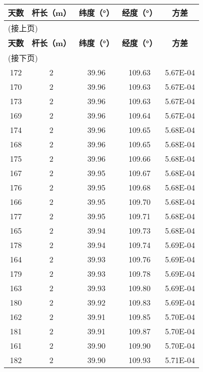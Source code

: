 \begin{longtable}{ccccc}
	
	\hline
	\hline
	\textbf{天数} & \textbf{杆长（m）} & \textbf{纬度（°）} & \textbf{经度（°）} & \textbf{方差}  \\
	\hline
	\hline
	\endfirsthead
	
	\multicolumn{5}{l}{(接上页)}\\
	
	\hline
	\hline
	\textbf{天数} & \textbf{杆长（m）} & \textbf{纬度（°）} & \textbf{经度（°）} & \textbf{方差}  \\
	\hline
	\hline
	\endhead
	\hline
	\multicolumn{5}{l}{(接下页)}
	
	\endfoot
	\hline
	\hline
	\endlastfoot
	171   & 2     & 39.97  & 109.63  & 5.67E-04 \\
	172   & 2     & 39.96  & 109.63  & 5.67E-04 \\
	170   & 2     & 39.96  & 109.63  & 5.67E-04 \\
	173   & 2     & 39.96  & 109.63  & 5.67E-04 \\
	169   & 2     & 39.96  & 109.64  & 5.67E-04 \\
	174   & 2     & 39.96  & 109.65  & 5.68E-04 \\
	168   & 2     & 39.96  & 109.65  & 5.68E-04 \\
	175   & 2     & 39.96  & 109.66  & 5.68E-04 \\
	167   & 2     & 39.95  & 109.67  & 5.68E-04 \\
	176   & 2     & 39.95  & 109.68  & 5.68E-04 \\
	166   & 2     & 39.95  & 109.70  & 5.68E-04 \\
	177   & 2     & 39.95  & 109.71  & 5.68E-04 \\
	165   & 2     & 39.94  & 109.73  & 5.68E-04 \\
	178   & 2     & 39.94  & 109.74  & 5.69E-04 \\
	164   & 2     & 39.93  & 109.76  & 5.69E-04 \\
	179   & 2     & 39.93  & 109.78  & 5.69E-04 \\
	163   & 2     & 39.93  & 109.80  & 5.69E-04 \\
	180   & 2     & 39.92  & 109.83  & 5.69E-04 \\
	162   & 2     & 39.91  & 109.85  & 5.70E-04 \\
	181   & 2     & 39.91  & 109.87  & 5.70E-04 \\
	161   & 2     & 39.90  & 109.90  & 5.70E-04 \\
	182   & 2     & 39.90  & 109.93  & 5.71E-04 \\

\end{longtable}

